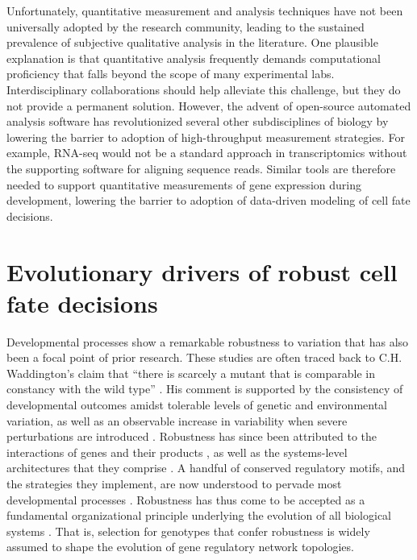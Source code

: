 Unfortunately, quantitative measurement and analysis techniques have not been universally adopted by the research community, leading to the sustained prevalence of subjective qualitative analysis in the literature. One plausible explanation is that quantitative analysis frequently demands computational proficiency that falls beyond the scope of many experimental labs. Interdisciplinary collaborations should help alleviate this challenge, but they do not provide a permanent solution. However, the advent of open-source automated analysis software has revolutionized several other subdisciplines of biology by lowering the barrier to adoption of high-throughput measurement strategies. For example, RNA-seq would not be a standard approach in transcriptomics without the supporting software for aligning sequence reads. Similar tools are therefore needed to support quantitative measurements of gene expression during development, lowering the barrier to adoption of data-driven modeling of cell fate decisions.


\section{Evolutionary drivers of robust cell fate decisions}

Developmental processes show a remarkable robustness to variation that has also been a focal point of prior research. These studies are often traced back to C.H. Waddington’s claim that “there is scarcely a mutant that is comparable in constancy with the wild type” \cite{Waddington1942}. His comment is supported by the consistency of developmental outcomes amidst tolerable levels of genetic and environmental variation, as well as an observable increase in variability when severe perturbations are introduced \cite{Bateman1959,Rendel1959,Rendel1966,Scharloo1991}. Robustness has since been attributed to the interactions of genes and their products \cite{Dun1958,Hogness1996,Rutherford1998}, as well as the systems-level architectures that they comprise \cite{Rutherford1998,Paulsen2011,Li2009,Eldar2002,Denby2012,Cassidy2013,Cassidy2016}. A handful of conserved regulatory motifs, and the strategies they implement, are now understood to pervade most developmental processes \cite{Freeman2000,Hartman2001,Alon2007,Marciano2014}. Robustness has thus come to be accepted as a fundamental organizational principle underlying the evolution of all biological systems \cite{Kitano2004}. That is, selection for genotypes that confer robustness is widely assumed to shape the evolution of gene regulatory network topologies. 

